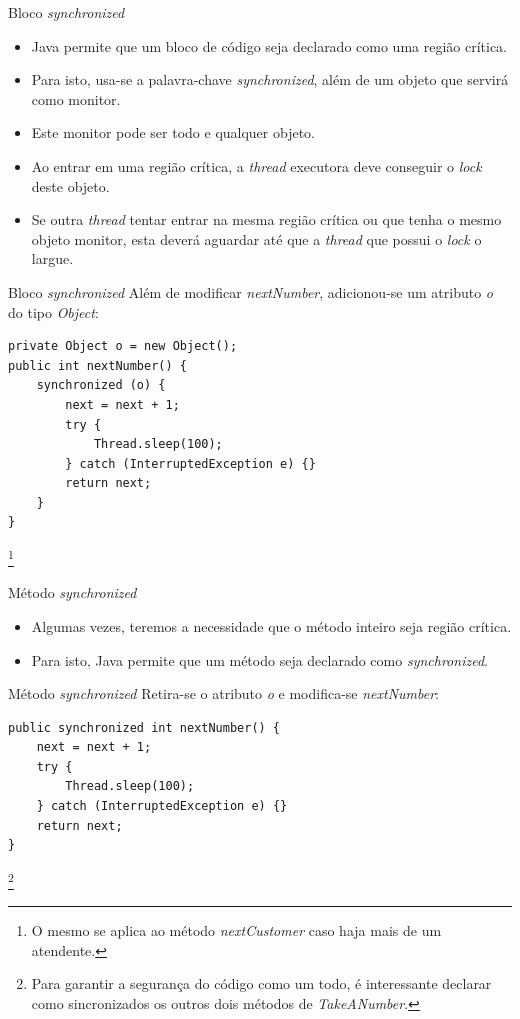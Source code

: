 \documentclass[11pt,justified]{beamer}
\begin{document}
\begin{frame}{Bloco \textit{synchronized}}
    \begin{itemize}
        \item Java permite que um bloco de código seja declarado como uma região crítica.
        \item Para isto, usa-se a palavra-chave \textit{synchronized}, além de um objeto que servirá como monitor.
        \item Este monitor pode ser todo e qualquer objeto.
        \item Ao entrar em uma região crítica, a \textit{thread} executora deve conseguir o \textit{lock} deste objeto.
        \item Se outra \textit{thread} tentar entrar na mesma região crítica ou que tenha o mesmo objeto monitor, esta deverá aguardar até que a \textit{thread} que possui o \textit{lock} o largue.
    \end{itemize}
\end{frame}

\begin{frame}[fragile]{Bloco \textit{synchronized}}
    Além de modificar \textit{nextNumber}, adicionou-se um atributo \textit{o} do tipo \textit{Object}:
    \begin{lstlisting}
private Object o = new Object();
public int nextNumber() {
    synchronized (o) {
        next = next + 1;
        try {
            Thread.sleep(100);
        } catch (InterruptedException e) {}
        return next;
    }
}
    \end{lstlisting}\footnote{O mesmo se aplica ao método \textit{nextCustomer} caso haja mais de um atendente.}
\end{frame}

\begin{frame}{Método \textit{synchronized}}
    \begin{itemize}
        \item Algumas vezes, teremos a necessidade que o método inteiro seja região crítica.
        \item Para isto, Java permite que um método seja declarado como \textit{synchronized}.
    \end{itemize}
\end{frame}

\begin{frame}[fragile]{Método \textit{synchronized}}
    Retira-se o atributo \textit{o} e modifica-se \textit{nextNumber}:
    \begin{lstlisting}
public synchronized int nextNumber() {
    next = next + 1;
    try {
        Thread.sleep(100);
    } catch (InterruptedException e) {}
    return next;
}
    \end{lstlisting}\footnote{Para garantir a segurança do código como um todo, é interessante declarar como sincronizados os outros dois métodos de \textit{TakeANumber}.}
\end{frame}
\end{document}
